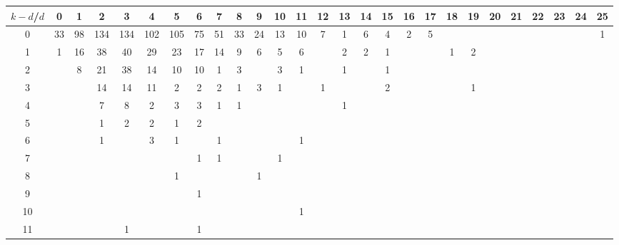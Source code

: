 \documentclass{article}
\begin{document}
\begin{landscape}

\begin{table}[h]\footnotesize
{\centering
\begin{tabular}{|c|c|
c|c|c|c|c|c|c|c|c|c|c|c|c|c|c|c|c|c|c|c|c|c|c|c|c|}
  \hline
  $k-d$/$d$ 
 & 0 & 1 & 2 & 3 & 4 & 5 & 6 & 7 & 8 & 9 & 10 & 11 & 12 & 13 & 14 & 15 & 16 & 17 & 18 & 19 & 20 & 21 & 22 & 23 & 24 & 25\\

  \hline
  \hline

0  & 33 & 98 & 134 & 134 & 102 & 105 & 75 & 51 & 33 & 24 & 13 & 10 & 7 & 1 & 6 & 4 & 2 & 5 &  &  &  &  &  &  &  & 1\\

1  & 1 & 16 & 38 & 40 & 29 & 23 & 17 & 14 & 9 & 6 & 5 & 6 &  & 2 & 2 & 1 &  &  & 1 & 2 &  &  &  &  &  & \\

2  &  & 8 & 21 & 38 & 14 & 10 & 10 & 1 & 3 &  & 3 & 1 &  & 1 &  & 1 &  &  &  &  &  &  &  &  &  & \\

3  &  &  & 14 & 14 & 11 & 2 & 2 & 2 & 1 & 3 & 1 &  & 1 &  &  & 2 &  &  &  & 1 &  &  &  &  &  & \\

4  &  &  & 7 & 8 & 2 & 3 & 3 & 1 & 1 &  &  &  &  & 1 &  &  &  &  &  &  &  &  &  &  &  & \\

5  &  &  & 1 & 2 & 2 & 1 & 2 &  &  &  &  &  &  &  &  &  &  &  &  &  &  &  &  &  &  & \\

6  &  &  & 1 &  & 3 & 1 &  & 1 &  &  &  & 1 &  &  &  &  &  &  &  &  &  &  &  &  &  & \\

7  &  &  &  &  &  &  & 1 & 1 &  &  & 1 &  &  &  &  &  &  &  &  &  &  &  &  &  &  & \\

8  &  &  &  &  &  & 1 &  &  &  & 1 &  &  &  &  &  &  &  &  &  &  &  &  &  &  &  & \\

9  &  &  &  &  &  &  & 1 &  &  &  &  &  &  &  &  &  &  &  &  &  &  &  &  &  &  & \\

10  &  &  &  &  &  &  &  &  &  &  &  & 1 &  &  &  &  &  &  &  &  &  &  &  &  &  & \\

11  &  &  &  & 1 &  &  & 1 &  &  &  &  &  &  &  &  &  &  &  &  &  &  &  &  &  &  & \\


\end{tabular}}
\end{table}
\end{landscape}
\end{document}
